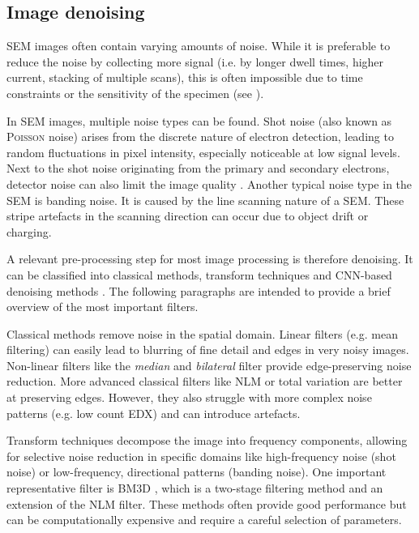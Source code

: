 
\FloatBarrier
\subsection{Image denoising}
\label{sec:denoising}


\ac{SEM} images often contain varying amounts of noise.
While it is preferable to reduce the noise by collecting more signal (i.e. by longer dwell times, higher current, stacking of multiple scans), this is often impossible due to time constraints or the sensitivity of the specimen (see ).

In \ac{SEM} images, multiple noise types can be found.
Shot noise (also known as \textsc{Poisson} noise) arises from the discrete nature of electron detection, leading to random fluctuations in pixel intensity, especially noticeable at low signal levels.
Next to the shot noise originating from the primary and secondary electrons, detector noise can also limit the image quality \cite{agarwal.2024}.
Another typical noise type in the \ac{SEM} is banding noise.
It is caused by the line scanning nature of a \ac{SEM}.
These stripe artefacts in the scanning direction can occur due to object drift or charging.

A relevant pre-processing step for most image processing is therefore denoising.
It can be classified into classical methods, transform techniques and \ac{CNN}-based denoising methods \cite{fan.2019}.
The following paragraphs are intended to provide a brief overview of the most important filters.

Classical methods remove noise in the spatial domain.
Linear filters (e.g. mean filtering) can easily lead to blurring of fine detail and edges in very noisy images.
Non-linear filters like the \textit{median} \cite{huang.1979} and \textit{bilateral} \cite{tomasi.1998} filter provide edge-preserving noise reduction.
More advanced classical filters like \ac{NLM} \cite{buades.2005} or total variation \cite{rudin.1992} are better at preserving edges.
However, they also struggle with more complex noise patterns (e.g. low count \ac{EDX}) and can introduce artefacts.

Transform techniques decompose the image into frequency components, allowing for selective noise reduction in specific domains like high-frequency noise (shot noise) or low-frequency, directional patterns (banding noise).
One important representative filter is \ac{BM3D} \cite{dabov.2007}, which is a two-stage filtering method and an extension of the \ac{NLM} filter.
These methods often provide good performance but can be computationally expensive and require a careful selection of parameters.

